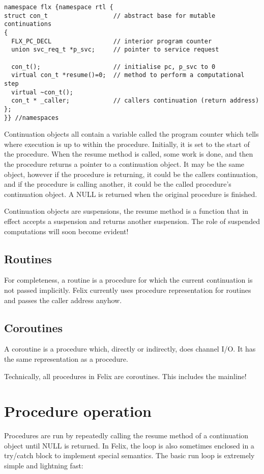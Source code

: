 \documentclass[oneside]{book}
\begin{document}
\begin{verbatim}
namespace flx {namespace rtl {
struct con_t                  // abstract base for mutable continuations
{
  FLX_PC_DECL                 // interior program counter
  union svc_req_t *p_svc;     // pointer to service request

  con_t();                    // initialise pc, p_svc to 0
  virtual con_t *resume()=0;  // method to perform a computational step
  virtual ~con_t();
  con_t * _caller;            // callers continuation (return address)
};
}} //namespaces
\end{verbatim}

Continuation objects all contain a variable called the program counter which tells
where execution is up to within the procedure. Initially, it is set to the start
of the procedure. When the resume method is called, some work is done, and then
the procedure returns a pointer to a continuation object. It may be the same
object, however if the procedure is returning, it could be the callers continuation,
and if the procedure is calling another, it could be the called procedure's 
continuation object. A NULL is returned when the original procedure is finished.

Continuation objects are suspensions, the resume method is a function that
in effect accepts a suspension and returns another suspension. The role
of suspended computations will soon become evident!

\subsection{Routines}
For completeness, a routine is a procedure for which the current continuation
is not passed implicitly.  Felix currently uses procedure representation for
routines and passes the caller address anyhow.

\subsection{Coroutines}
A coroutine is a procedure which, directly or indirectly, does channel I/O.
It has the same representation as a procedure.

Technically, all procedures in Felix are coroutines. This includes the mainline!

\section{Procedure operation}
Procedures are run by repeatedly calling the resume method of a continuation
object until NULL is returned. In Felix, the loop is also sometimes enclosed
in a try/catch block to implement special semantics. The basic run loop is
extremely simple and lightning fast:
\end{document}
